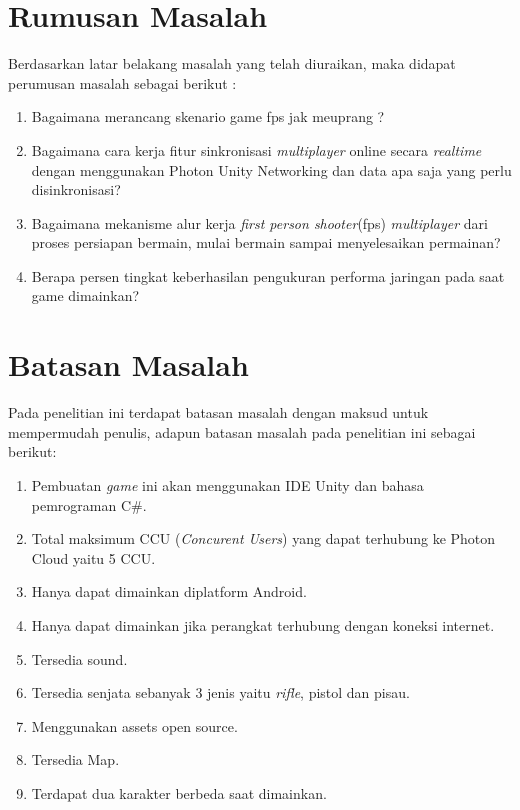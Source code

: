 \section{Rumusan Masalah}
\noindent

Berdasarkan latar belakang masalah yang telah diuraikan, maka didapat perumusan masalah sebagai berikut :
\begin{enumerate}
	\item Bagaimana merancang skenario game fps jak meuprang ?
	\item Bagaimana cara kerja fitur sinkronisasi \textit{multiplayer} online secara \textit{realtime} dengan menggunakan Photon Unity Networking dan data apa saja yang perlu disinkronisasi?
	\item Bagaimana mekanisme alur kerja \textit{first person shooter}(fps) \textit{multiplayer} dari proses persiapan bermain, mulai bermain sampai menyelesaikan permainan?
	\item Berapa persen tingkat keberhasilan pengukuran performa jaringan pada saat game dimainkan?
\end{enumerate}	

\section{Batasan Masalah}
\noindent

Pada penelitian ini terdapat batasan masalah dengan maksud untuk mempermudah penulis, adapun batasan masalah pada penelitian ini sebagai berikut:
\begin{enumerate}
	\item Pembuatan \textit{\textit{game}} ini akan menggunakan IDE Unity dan bahasa pemrograman C\#.
	\item Total maksimum CCU (\textit{Concurent Users}) yang dapat terhubung ke Photon Cloud yaitu 5 CCU.
	\item Hanya dapat dimainkan diplatform Android.
	\item Hanya dapat dimainkan jika perangkat terhubung dengan koneksi internet.
	\item Tersedia sound.
	\item Tersedia senjata sebanyak 3 jenis yaitu \textit{rifle}, pistol dan pisau.
	\item Menggunakan assets open source.
	\item Tersedia Map.
	\item Terdapat dua karakter berbeda saat dimainkan.
\end{enumerate}

